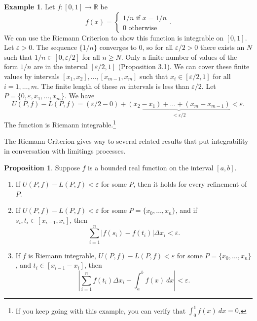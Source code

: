 \documentclass{article}
\newcommand{\R}{\mathbb{R}}
\theoremstyle{definition}
\newtheorem{proposition}{Proposition}[section]
\newtheorem{example}{Example}[section]
\begin{document}
	\begin{example}
		Let $ f:[0,1]\to \R $ be $$f(x)=\begin{cases}
			1/n\text{ if }x=1/n\\0\text{ otherwise}
		\end{cases}. $$ We can use the Riemann Criterion to show this function is integrable on $ [0,1] $. Let $ \varepsilon>0 $. The sequence $ \{1/n\} $ converges to $ 0 $, so for all $ \varepsilon/2>0 $ there exists an $ N $ such that $ 1/n\in[0,\varepsilon/2] $ for all $ n\ge N $. Only a finite number of values of the form $ 1/n $ are in the interval $ [\varepsilon/2,1] $ (Proposition 3.1). We can cover these finite values by intervals $ [x_1,x_2],\ldots,[x_{m-1},x_m] $ such that $ x_i\in[\varepsilon/2,1] $ for all $ i=1,\ldots,m $. The finite length of these $ m $ intervals is less than $ \varepsilon/2 $. Let $ P=\{0,\varepsilon,x_1,\ldots,x_m\} $. We have $$U(P,f)-L(P,f)=(\varepsilon/2-0)+\underbrace{(x_2-x_1)+\ldots+(x_m-x_{m-1}) }_{<\varepsilon/2}<\varepsilon.$$ The function is Riemann integrable.\footnote{If you keep going with this example, you can verify that $ \int_{0}^{1}f(x)\ dx=0 $.} 
	\end{example}
	The Riemann Criterion gives way to several related results that put integrability in conversation with limitings processes. 
	\begin{proposition}
		Suppose $ f $ is a bounded real function on the interval $ [a,b] $.
		\begin{enumerate}
			\item If $ U(P,f)-L(P,f)<\varepsilon $ for some $ P $, then it holds for every refinement of $ P $.
			\item If $ U(P,f)-L(P,f)<\varepsilon $ for some $ P=\{x_0,\ldots,x_n\} $, and if $ s_i,t_i\in[x_{i-1},x_{i}] $, then $$ \sum_{i=1}^n|f(s_i)-f(t_i)|\Delta x_i<\varepsilon.$$
			\item If $ f $ is Riemann integrable, $ U(P,f)-L(P,f)<\varepsilon $ for some $ P=\{x_0,\ldots,x_n\} $, and $ t_i\in[x_{i-1}-x_{i}]$, then $$ \left\lvert \sum_{i=1}^nf(t_i)\Delta x_i-\int_{a}^{b}f(x)\ dx\right\rvert<\varepsilon.$$
		\end{enumerate}
	\end{proposition}
\end{document}
